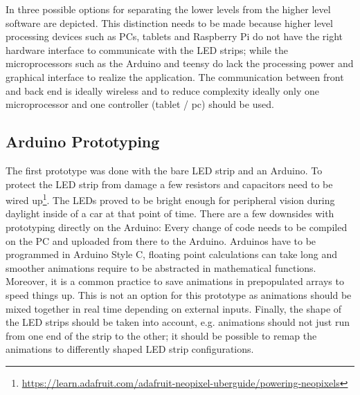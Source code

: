 In \emph{} three possible options for separating the lower levels from the higher level software are depicted. This distinction needs to be made because higher level processing devices such as PCs, tablets and Raspberry Pi do not have the right hardware interface to communicate with the LED strips; while the microprocessors such as the Arduino and teensy do lack the processing power and graphical interface to realize the application. 
The communication between front and back end is ideally wireless and to reduce complexity ideally only one microprocessor and one controller (tablet / pc) should be used.  

\subsection{Arduino Prototyping}
\label{arduino}
The first prototype was done with the bare LED strip and an Arduino. To protect the LED strip from damage a few resistors and capacitors need to be wired up\footnote{\url{https://learn.adafruit.com/adafruit-neopixel-uberguide/powering-neopixels}}. The LEDs proved to be bright enough for peripheral vision during daylight inside of a car at that point of time. There are a few downsides with prototyping directly on the Arduino: Every change of code needs to be compiled on the PC and uploaded from there to the Arduino. Arduinos have to be programmed in Arduino Style C, floating point calculations can take long and smoother animations require to be abstracted in mathematical functions. Moreover, it is a common practice to save  animations in prepopulated arrays to speed things up. This is not an option for this prototype as animations should be mixed together in real time depending on external inputs. Finally, the shape of the LED strips should be taken into account, e.g. animations should not just run from one end of the strip to the other; it should be possible to remap the animations to differently shaped LED strip configurations. 

